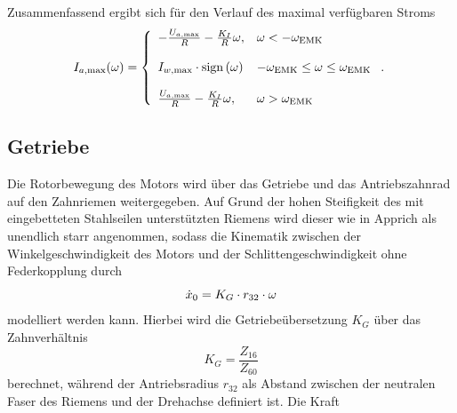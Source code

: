 Zusammenfassend ergibt sich für den Verlauf des maximal verfügbaren Stroms  
\[
I_{a \mathrm{, max}}(\omega) = \left\{\begin{array}{lll}
														-\frac{U_{a \mathrm{, max}}}{R} - \frac{K_I}{R} \omega, & \omega < -\omega_{\mathrm{EMK}}   \\ \\
														I_{w\mathrm{, max}} \cdot \mathrm{sign}\left(\omega\right) 	& -\omega_{\mathrm{EMK}} \leq \omega \leq \omega_{\mathrm{EMK}} \\ \\				
														\frac{U_{a \mathrm{, max}}}{R} - \frac{K_I}{R} \omega, & \omega > \omega_{\mathrm{EMK}} \end{array}\right. . \
\] 



\subsection{Getriebe}


Die Rotorbewegung des Motors wird über das Getriebe und das Antriebszahnrad auf den Zahnriemen weitergegeben. Auf Grund der hohen Steifigkeit des mit eingebetteten Stahlseilen unterstützten Riemens wird dieser wie in Apprich \cite{apprich} als unendlich starr angenommen, sodass die Kinematik zwischen der Winkelgeschwindigkeit des Motors und der Schlittengeschwindigkeit ohne Federkopplung durch 
\[
	\dot{x}_0 = K_G \cdot r_{32} \cdot \omega
\]
modelliert werden kann.
 Hierbei wird die Getriebeübersetzung $K_G$ über das Zahnverhältnis 
\[
	K_G =  \frac{Z_{16}}{Z_{60}}
\]
berechnet, während der Antriebsradius $r_{32}$ als Abstand zwischen der neutralen Faser des Riemens und der Drehachse definiert ist.
Die Kraft 


